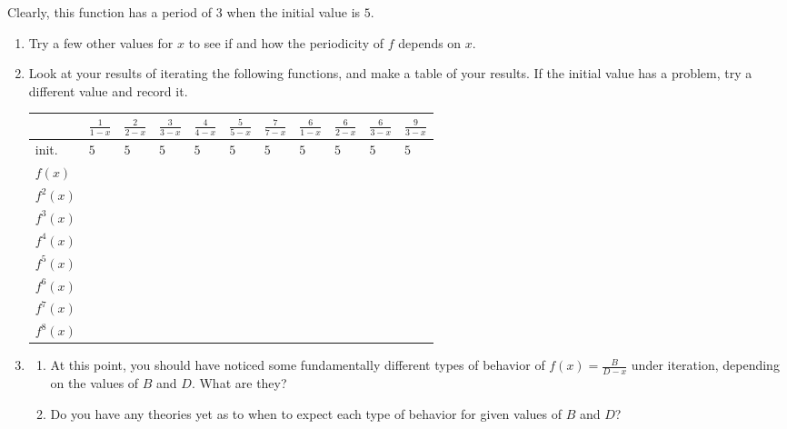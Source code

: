 \documentclass[../gatm.tex]{subfiles}
\begin{document}
Clearly, this function has a period of $3$ when the initial value is $5$.
\begin{enumerate}
\setcounter{enumi}{\value{problem_i}}
\item Try a few other values for $x$ to see if and how the periodicity of $f$ depends on $x$.
\item Look at your results of iterating the following functions, and make a table of your results. If the initial value has a problem, try a different value and record it.
\begin{center}
\renewcommand*{\arraystretch}{1.4}
\begin{tabular}{|l|l|l|l|l|l|l|l|l|l|l|}
\hline
         & $\frac{1}{1-x}$ & $\frac{2}{2-x}$ & $\frac{3}{3-x}$ & $\frac{4}{4-x}$ & $\frac{5}{5-x}$ & $\frac{7}{7-x}$ & $\frac{6}{1-x}$ & $\frac{6}{2-x}$ & $\frac{6}{3-x}$ & $\frac{9}{3-x}$ \\ \hline
init.    & $5$   & $5$   & $5$ & $5$ & $5$ & $5$ & $5$ & $5$ & $5$ & $5$ \\ \hline
$f(x)$   &       &       &   &   &   &   &   &   &   &   \\ \hline
$f^2(x)$ &       &       &   &   &   &   &   &   &   &   \\ \hline
$f^3(x)$ &       &       &   &   &   &   &   &   &   &   \\ \hline
$f^4(x)$ &       &       &   &   &   &   &   &   &   &   \\ \hline
$f^5(x)$ &       &       &   &   &   &   &   &   &   &   \\ \hline
$f^6(x)$ &       &       &   &   &   &   &   &   &   &   \\ \hline
$f^7(x)$ &       &       &   &   &   &   &   &   &   &   \\ \hline
$f^8(x)$ &       &       &   &   &   &   &   &   &   &   \\ \hline
\end{tabular}
\end{center}
\item \begin{enumerate}
\item At this point, you should have noticed some fundamentally different types of behavior of $f(x)=\frac{B}{D-x}$ under iteration, depending on the values of $B$ and $D$. What are they?
\item Do you have any theories yet as to when to expect each type of behavior for given values of $B$ and $D$? 
\end{enumerate}
\setcounter{problem_i}{\value{enumi}}
\end{enumerate}
\end{document}
